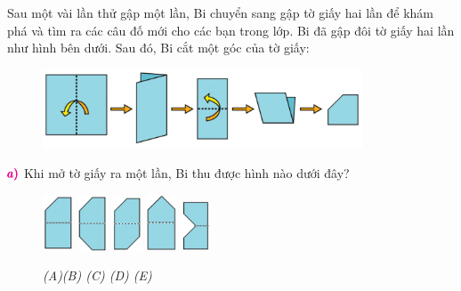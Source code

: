 Sau một vài lần thử gập một lần, Bi chuyển sang gập tờ giấy hai lần để khám phá và tìm ra các câu đố mới cho các bạn trong lớp.
\vskip 0.1cm
Bi đã gập đôi tờ giấy hai lần như hình bên dưới. Sau đó, Bi cắt một góc của tờ giấy: 
\begin{figure}[H]
	\captionsetup{labelformat=empty}
	\vspace*{5pt}
	\centering
	\captionsetup{justification=raggedleft}
	\includegraphics[width =0.85\textwidth]{cat-7a}
\end{figure}
$\color{toancuabi}\pmb{a)}$ Khi mở tờ giấy ra một lần, Bi thu được hình nào dưới đây?
\begin{figure}[H]
	\centering
	\captionsetup{labelformat=empty}
	\vspace*{-4pt}
	\captionsetup{justification=centering}
	\includegraphics[width =0.08\textwidth]{cat-8a}
	\hfill
	\includegraphics[width =0.08\textwidth]{cat-8b}
	\hfill
	\includegraphics[width =0.08\textwidth]{cat-8c}
	\hfill
	\includegraphics[width =0.08\textwidth]{cat-8d}
	\hfill
	\includegraphics[width =0.08\textwidth]{cat-8e}	
	\caption{\small \it (A)\hfill (B) \hfill (C) \hfill (D) \hfill (E)}
	\vspace*{-10pt}
\end{figure}

